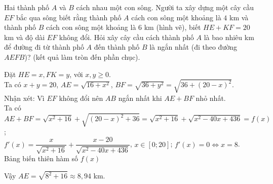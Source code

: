 \begin{ex}%
Hai thành phố $A$ và $B$ cách nhau một con sông. Người ta xây dựng một cây cầu $EF$ bắc qua sông biết rằng thành phố $A$ cách con sông một khoảng là $4$ km và thành phố $B$ cách con sông một khoảng là $6$ km (hình vẽ), biết $HE+K F=20$ km và độ dài $E F$ không đổi. Hỏi xây cây cầu cách thành phố $A$ là bao nhiêu km để đường đi từ thành phố $A$ đến thành phố $B$ là ngắn nhất (đi theo đường $A E F B$)? (kết quả làm tròn đến phần chục).
\begin{center}
\end{center}
\loigiai
{
Đặt $H E=x, F K=y$, với $x, y \geq  0$.\\
Ta có $x+y=20$, $AE=\sqrt{16+x^2}$, $B F=\sqrt{36+y^2}=\sqrt{36+(20-x)^2}$. \\
Nhận xét: Vì $EF$ không đổi nên $AB$ ngắn nhất khi $A E+B F$ nhỏ nhất. \\
Ta có $A E+B F=\sqrt{x^2+16}+\sqrt{(20-x)^2+36}=\sqrt{x^2+16}+\sqrt{x^2-40 x+436}=f(x)$;\\
$f'(x)=\dfrac{x}{\sqrt{x^2+16}}+\dfrac{x-20}{\sqrt{x^2-40 x+436}}$, $x \in [0 ; 20]$; 
$f'(x)=0 \Leftrightarrow  x=8$. \\
Bảng biến thiên hàm số $f(x)$
\begin{center}
\end{center}
Vậy $A E=\sqrt{8^2+16} \approx 8{,}94$ km.
}
\end{ex}

